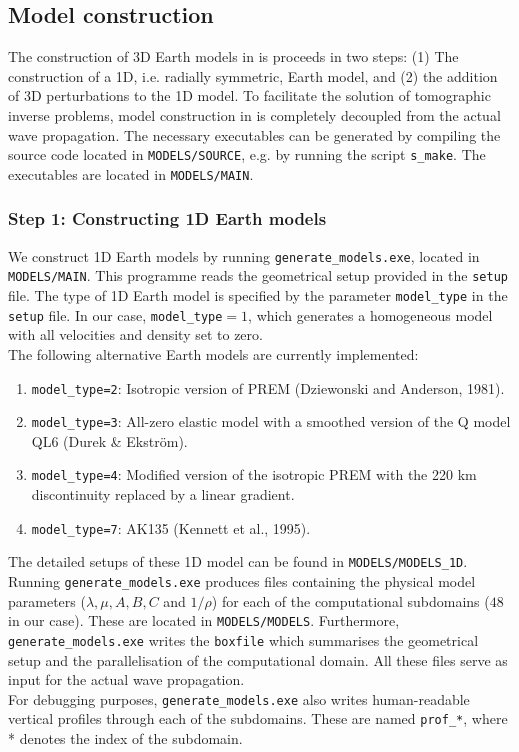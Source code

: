 
\subsection{Model construction}\label{S:model_generation}

The construction of 3D Earth models in \SES is proceeds in two steps: (1) The construction of a 1D, i.e. radially symmetric, Earth model, and (2) the addition of 3D perturbations to the 1D model. To facilitate the solution of tomographic inverse problems, model construction in \SES is completely decoupled from the actual wave propagation. The necessary executables can be generated by compiling the source code located in \texttt{MODELS/SOURCE}, e.g. by running the script \texttt{s\_make}. The executables are located in \texttt{MODELS/MAIN}.

\subsubsection{Step 1: Constructing 1D Earth models}

We construct 1D Earth models by running \texttt{generate\_models.exe}, located in \texttt{MODELS/MAIN}. This programme reads the geometrical setup provided in the \texttt{setup} file. The type of 1D Earth model is specified by the parameter \texttt{model\_type} in the \texttt{setup} file. In our case, \texttt{model\_type}$=1$, which generates a homogeneous model with all velocities and density set to zero.\\[5pt]
The following alternative Earth models are currently implemented:
\begin{enumerate}
\item \texttt{model\_type=2}: Isotropic version of PREM (Dziewonski and Anderson, 1981).
\item \texttt{model\_type=3}: All-zero elastic model with a smoothed version of the Q model QL6 (Durek \& Ekstr\"{o}m).
\item \texttt{model\_type=4}: Modified version of the isotropic PREM with the 220 km discontinuity replaced by a linear gradient.
\item \texttt{model\_type=7}: AK135 (Kennett et al., 1995).
\end{enumerate}
The detailed setups of these 1D model can be found in \texttt{MODELS/MODELS\_1D}.\\[5pt]
Running \texttt{generate\_models.exe} produces files containing the physical model parameters ($\lambda, \mu, A, B, C$ and $1/\rho$) for each of the computational subdomains ($48$ in our case). These are located in \texttt{MODELS/MODELS}. Furthermore, \texttt{generate\_models.exe} writes the \texttt{boxfile} which summarises the geometrical setup and the parallelisation of the computational domain. All these files serve as input for the actual wave propagation.\\[5pt]
For debugging purposes, \texttt{generate\_models.exe} also writes human-readable vertical profiles through each of the subdomains. These are named \texttt{prof\_*}, where * denotes the index of the subdomain.

